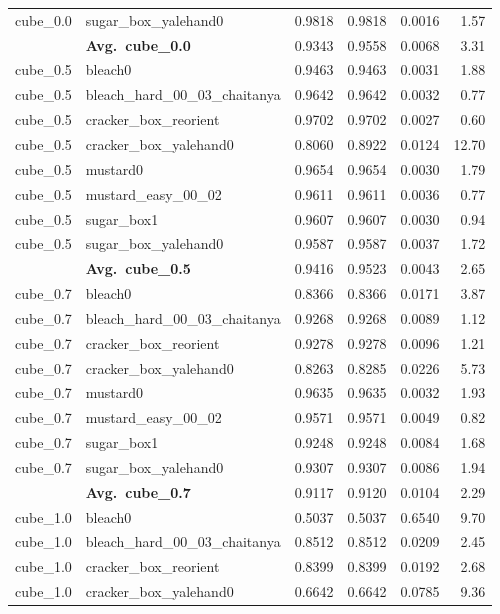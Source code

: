 \begin{longtable}{llrrrr}
  cube_0.0 & sugar\_box\_yalehand0 & 0.9818 & 0.9818 & 0.0016 & 1.57 \\
  \cmidrule{2-6}
  & \textbf{Avg.~cube_0.0} & 0.9343 & 0.9558 & 0.0068 & 3.31 \\
  \midrule
  cube_0.5 & bleach0 & 0.9463 & 0.9463 & 0.0031 & 1.88 \\
  cube_0.5 & bleach\_hard\_00\_03\_chaitanya & 0.9642 & 0.9642 & 0.0032 & 0.77 \\
  cube_0.5 & cracker\_box\_reorient & 0.9702 & 0.9702 & 0.0027 & 0.60 \\
  cube_0.5 & cracker\_box\_yalehand0 & 0.8060 & 0.8922 & 0.0124 & 12.70 \\
  cube_0.5 & mustard0 & 0.9654 & 0.9654 & 0.0030 & 1.79 \\
  cube_0.5 & mustard\_easy\_00\_02 & 0.9611 & 0.9611 & 0.0036 & 0.77 \\
  cube_0.5 & sugar\_box1 & 0.9607 & 0.9607 & 0.0030 & 0.94 \\
  cube_0.5 & sugar\_box\_yalehand0 & 0.9587 & 0.9587 & 0.0037 & 1.72 \\
  \cmidrule{2-6}
  & \textbf{Avg.~cube_0.5} & 0.9416 & 0.9523 & 0.0043 & 2.65 \\
  \midrule
  cube_0.7 & bleach0 & 0.8366 & 0.8366 & 0.0171 & 3.87 \\
  cube_0.7 & bleach\_hard\_00\_03\_chaitanya & 0.9268 & 0.9268 & 0.0089 & 1.12 \\
  cube_0.7 & cracker\_box\_reorient & 0.9278 & 0.9278 & 0.0096 & 1.21 \\
  cube_0.7 & cracker\_box\_yalehand0 & 0.8263 & 0.8285 & 0.0226 & 5.73 \\
  cube_0.7 & mustard0 & 0.9635 & 0.9635 & 0.0032 & 1.93 \\
  cube_0.7 & mustard\_easy\_00\_02 & 0.9571 & 0.9571 & 0.0049 & 0.82 \\
  cube_0.7 & sugar\_box1 & 0.9248 & 0.9248 & 0.0084 & 1.68 \\
  cube_0.7 & sugar\_box\_yalehand0 & 0.9307 & 0.9307 & 0.0086 & 1.94 \\
  \cmidrule{2-6}
  & \textbf{Avg.~cube_0.7} & 0.9117 & 0.9120 & 0.0104 & 2.29 \\
  \midrule
  cube_1.0 & bleach0 & 0.5037 & 0.5037 & 0.6540 & 9.70 \\
  cube_1.0 & bleach\_hard\_00\_03\_chaitanya & 0.8512 & 0.8512 & 0.0209 & 2.45 \\
  cube_1.0 & cracker\_box\_reorient & 0.8399 & 0.8399 & 0.0192 & 2.68 \\
  cube_1.0 & cracker\_box\_yalehand0 & 0.6642 & 0.6642 & 0.0785 & 9.36 \\

\end{longtable}
